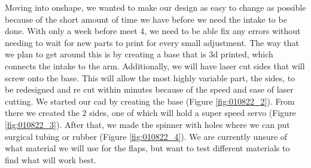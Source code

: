 Moving into onshape, we wanted to make our design as easy to change as possible because of the short amount of time we have before we need the intake to be done. With only a week before meet 4, we need to be able fix any errors without needing to wait for new parts to print for every small adjustment. The way that we plan to get around this is by creating a base that is 3d printed, which connects the intake to the arm. Additionally, we will have laser cut sides that will screw onto the base. This will allow the most highly variable part, the sides, to be redesigned and re cut within minutes because of the speed and ease of laser cutting. We started our cad by creating the base (Figure \ref{fig:010822_2}). From there we created the 2 sides, one of which will hold a super speed servo (Figure \ref{fig:010822_3}). After that, we made the spinner with holes where we can put surgical tubing or rubber (Figure \ref{fig:010822_4}). We are currently unsure of what material we will use for the flaps, but want to test different materials to find what will work best.


